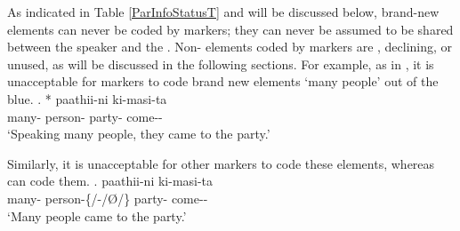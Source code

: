 As indicated in Table \ref{ParInfoStatusT} and will be discussed below,
brand-new elements can never be coded by  markers;
they can never be assumed to be shared between the speaker and the .
Non- elements coded by  markers are
, declining, or unused,
as will be discussed in the following sections.
For example,
as in \Next,
it is unacceptable for  markers to code brand new elements  `many people' out of the blue.
%
\exg.
 *  paathii-ni ki-masi-ta \\
  many- person- party- come-- \\
  `Speaking many people, they came to the party.'
    \hfill{\cite[~45]{kuno73}}

Similarly, it is unacceptable for other  markers to code these elements, whereas  can code them.
%
\exg.
   paathii-ni ki-masi-ta \\
 many- person-{\{/-/{\O}/\}} party- come-- \\
 `Many people came to the party.'




